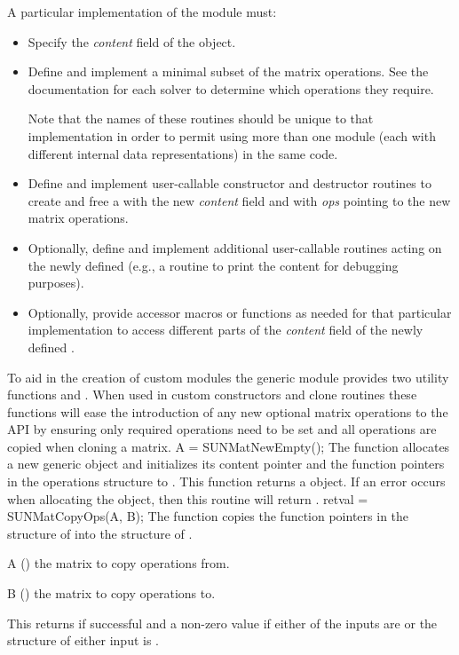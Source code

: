 A particular implementation of the {\sunmatrix} module must:
\begin{itemize}
\item Specify the {\em content} field of the  object.
\item Define and implement a minimal subset of the matrix operations.
  See the documentation for each {\sundials} solver to determine which
  {\sunmatrix} operations they require.

  Note that the names of these routines should be unique to that
  implementation in order to permit using more than one {\sunmatrix}
  module (each with different  internal data
  representations) in the same code.
\item Define and implement user-callable constructor and destructor
  routines to create and free a  with
  the new {\em content} field and with {\em ops} pointing to the
  new matrix operations.
\item Optionally, define and implement additional user-callable routines
  acting on the newly defined  (e.g., a routine to print
  the content for debugging purposes).
\item Optionally, provide accessor macros or functions as needed for
  that particular implementation to access different parts
  of the {\em content} field of the newly defined .
\end{itemize}

To aid in the creation of custom {\sunmatrix} modules the generic {\sunmatrix}
module provides two utility functions  and
. When used in custom {\sunmatrix} constructors and clone
routines these functions will ease the introduction of any new optional matrix
operations to the {\sunmatrix} API by ensuring only required operations need to
be set and all operations are copied when cloning a matrix.
%
%
{
  A = SUNMatNewEmpty();
}
{
  The function  allocates a new generic {\sunmatrix} object
  and initializes its content pointer and the function pointers in the
  operations structure to .
}
{}
{
  This function returns a  object. If an error occurs when
  allocating the object, then this routine will return .
}
{}
%
%
{
  retval = SUNMatCopyOps(A, B);
}
{
  The function  copies the function pointers in the 
  structure of  into the  structure of .
}
{
  \begin{args}[w]
  \item[A] () the matrix to copy operations from.
  \item[B] () the matrix to copy operations to.
  \end{args}
}
{
  This returns  if successful and a non-zero value if either of the inputs
  are  or the  structure of either input is .
}
{}

